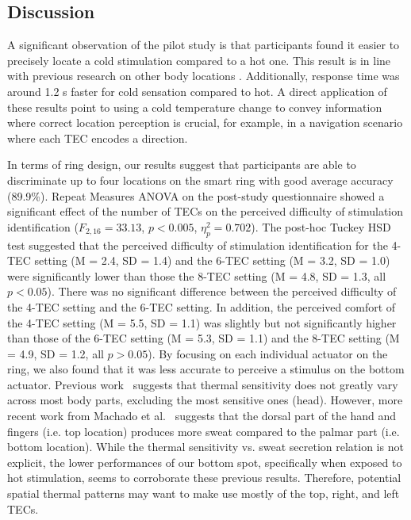 \documentclass[preprint,12pt]{elsarticle}
\begin{document}
\subsection{Discussion}
A significant observation of the pilot study is that participants found it easier to precisely locate a cold stimulation compared to a hot one. This result is in line with previous research on other body locations \cite{10}. Additionally, response time was around 1.2 s faster for cold sensation compared to hot. A direct application of these results point to using a cold temperature change to convey information where correct location perception is crucial, for example, in a navigation scenario where each TEC encodes a direction.

In terms of ring design, our results suggest that participants are able to discriminate up to four locations on the smart ring with good average accuracy (89.9\%). Repeat Measures ANOVA on the post-study questionnaire showed a significant effect of the number of TECs on the perceived difficulty of stimulation identification ($F_{2, 16} = 33.13$, $p < 0.005$, $\eta_p^2 = 0.702$).
The post-hoc Tuckey HSD test suggested that the perceived difficulty of stimulation identification for the 4-TEC setting (M = 2.4, SD = 1.4) and the 6-TEC setting (M = 3.2, SD = 1.0) were significantly lower than those the 8-TEC setting (M = 4.8, SD = 1.3, all $p<0.05$). There was no significant difference between the perceived difficulty of the 4-TEC setting and the 6-TEC setting. In addition, the perceived comfort of the 4-TEC setting (M = 5.5, SD = 1.1) was slightly but not significantly higher than those of the 6-TEC setting (M = 5.3, SD = 1.1) and the 8-TEC setting (M = 4.9, SD = 1.2, all $p>0.05$).
By focusing on each individual actuator on the ring, we also found that it was less accurate to perceive a stimulus on the bottom actuator.
Previous work~\cite{31} suggests that thermal sensitivity does not greatly vary across most body parts, excluding the most sensitive ones (head).
However, more recent work from Machado et al.~\cite{Machado2008} suggests that the dorsal part of the hand and fingers (i.e. top location) produces more sweat compared to the palmar part (i.e. bottom location).
While the thermal sensitivity vs. sweat secretion relation is not explicit, the lower performances of our bottom spot, specifically when exposed to hot stimulation, seems to corroborate these previous results.
Therefore, potential spatial thermal patterns may want to make use mostly of the top, right, and left TECs.
\end{document}
